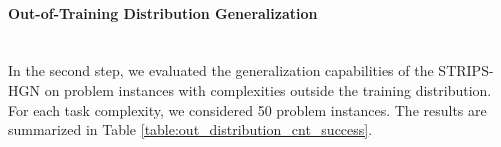 \paragraph*{Out-of-Training Distribution Generalization} \mbox{}\\
In the second step, we evaluated the generalization capabilities of the STRIPS-HGN on problem instances with complexities outside the training distribution. For each task complexity, we considered 50 problem instances. The results are summarized in Table \ref{table:out_distribution_cnt_success}.






